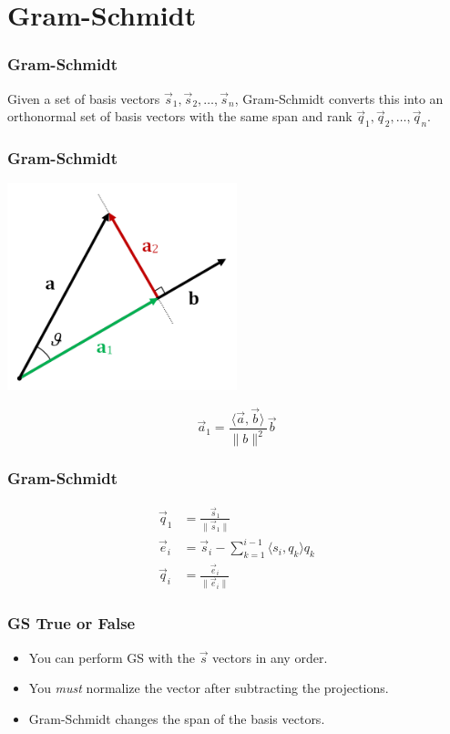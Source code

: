 \section{Gram-Schmidt}

\begin{frame}
    \frametitle{Gram-Schmidt}

    Given a set of basis vectors \(\vec{s}_1, \vec{s}_2, \ldots, \vec{s}_n\), Gram-Schmidt converts this into an orthonormal set of basis vectors with the same span and rank \(\vec{q}_1, \vec{q}_2, \ldots, \vec{q}_n\).
\end{frame}

\begin{frame}
    \frametitle{Gram-Schmidt}

    \begin{center}
        \includegraphics[width=0.5\textwidth]{images/projection.png}
    \end{center}

    \begin{equation}
        \vec{a}_1 = \frac{\langle \vec{a}, \vec{b} \rangle}{\|b\|^2} \vec{b}
    \end{equation}
\end{frame}

\begin{frame}
    \frametitle{Gram-Schmidt}

    \begin{align}
        \vec{q}_1 &= \frac{\vec{s}_1}{\|\vec{s}_1\|} \\
        \vec{e}_i &= \vec{s}_i - \sum_{k = 1}^{i - 1} \langle s_i, q_k \rangle q_k \\
        \vec{q}_i &= \frac{\vec{e}_i}{\|\vec{e}_i\|}
    \end{align}
\end{frame}

\begin{frame}
    \frametitle{GS True or False}

    \begin{itemize}
        \item You can perform GS with the \(\vec{s}\) vectors in any order. 
        \item You \emph{must} normalize the vector after subtracting the projections. 
        \item Gram-Schmidt changes the span of the basis vectors. 
    \end{itemize}
\end{frame}
